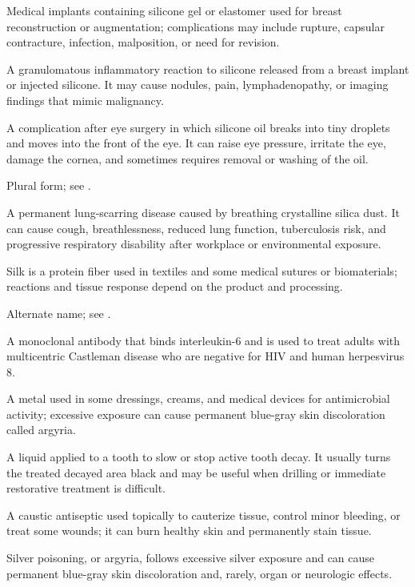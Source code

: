  Medical implants containing silicone gel or elastomer used for breast reconstruction or augmentation; complications may include rupture, capsular contracture, infection, malposition, or need for revision.

 A granulomatous inflammatory reaction to silicone released from a breast implant or injected silicone. It may cause nodules, pain, lymphadenopathy, or imaging findings that mimic malignancy.

 A complication after eye surgery in which silicone oil breaks into tiny droplets and moves into the front of the eye. It can raise eye pressure, irritate the eye, damage the cornea, and sometimes requires removal or washing of the oil.

 Plural form; see .

 A permanent lung-scarring disease caused by breathing crystalline silica dust. It can cause cough, breathlessness, reduced lung function, tuberculosis risk, and progressive respiratory disability after workplace or environmental exposure.

 Silk is a protein fiber used in textiles and some medical sutures or biomaterials; reactions and tissue response depend on the product and processing.

 Alternate name; see .

 A monoclonal antibody that binds interleukin-6 and is used to treat adults with multicentric Castleman disease who are negative for HIV and human herpesvirus 8.

 A metal used in some dressings, creams, and medical devices for antimicrobial activity; excessive exposure can cause permanent blue-gray skin discoloration called argyria.

 A liquid applied to a tooth to slow or stop active tooth decay. It usually turns the treated decayed area black and may be useful when drilling or immediate restorative treatment is difficult.

 A caustic antiseptic used topically to cauterize tissue, control minor bleeding, or treat some wounds; it can burn healthy skin and permanently stain tissue.

 Silver poisoning, or argyria, follows excessive silver exposure and can cause permanent blue-gray skin discoloration and, rarely, organ or neurologic effects.

